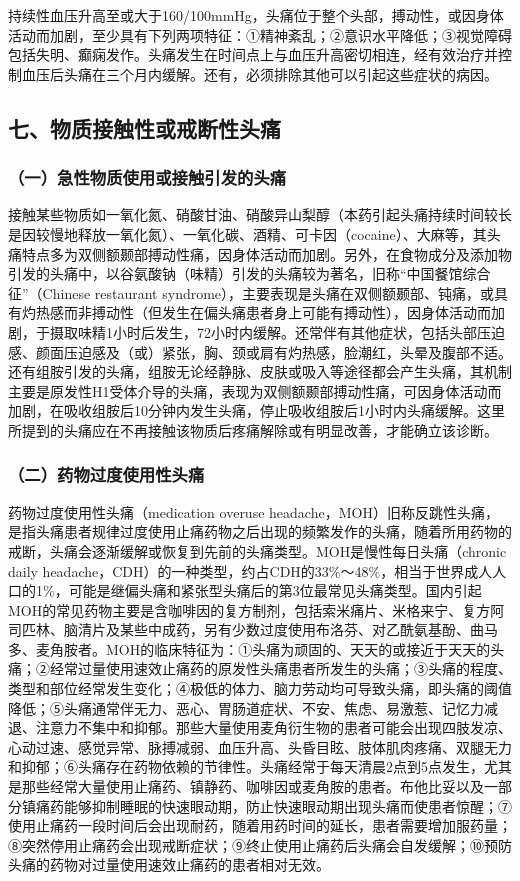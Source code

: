 持续性血压升高至或大于160/100mmHg，头痛位于整个头部，搏动性，或因身体活动而加剧，至少具有下列两项特征：①精神紊乱；②意识水平降低；③视觉障碍包括失明、癫痫发作。头痛发生在时间点上与血压升高密切相连，经有效治疗并控制血压后头痛在三个月内缓解。还有，必须排除其他可以引起这些症状的病因。

\subsection{七、物质接触性或戒断性头痛}

\subsubsection{（一）急性物质使用或接触引发的头痛}

接触某些物质如一氧化氮、硝酸甘油、硝酸异山梨醇（本药引起头痛持续时间较长是因较慢地释放一氧化氮）、一氧化碳、酒精、可卡因（cocaine）、大麻等，其头痛特点多为双侧额颞部搏动性痛，因身体活动而加剧。另外，在食物成分及添加物引发的头痛中，以谷氨酸钠（味精）引发的头痛较为著名，旧称“中国餐馆综合征”（Chinese
restaurant
syndrome），主要表现是头痛在双侧额颞部、钝痛，或具有灼热感而非搏动性（但发生在偏头痛患者身上可能有搏动性），因身体活动而加剧，于摄取味精1小时后发生，72小时内缓解。还常伴有其他症状，包括头部压迫感、颜面压迫感及（或）紧张，胸、颈或肩有灼热感，脸潮红，头晕及腹部不适。还有组胺引发的头痛，组胺无论经静脉、皮肤或吸入等途径都会产生头痛，其机制主要是原发性H1受体介导的头痛，表现为双侧额颞部搏动性痛，可因身体活动而加剧，在吸收组胺后10分钟内发生头痛，停止吸收组胺后1小时内头痛缓解。这里所提到的头痛应在不再接触该物质后疼痛解除或有明显改善，才能确立该诊断。

\subsubsection{（二）药物过度使用性头痛}

药物过度使用性头痛（medication overuse
headache，MOH）旧称反跳性头痛，是指头痛患者规律过度使用止痛药物之后出现的频繁发作的头痛，随着所用药物的戒断，头痛会逐渐缓解或恢复到先前的头痛类型。MOH是慢性每日头痛（chronic
daily
headache，CDH）的一种类型，约占CDH的33\%～48\%，相当于世界成人人口的1\%，可能是继偏头痛和紧张型头痛后的第3位最常见头痛类型。国内引起MOH的常见药物主要是含咖啡因的复方制剂，包括索米痛片、米格来宁、复方阿司匹林、脑清片及某些中成药，另有少数过度使用布洛芬、对乙酰氨基酚、曲马多、麦角胺者。MOH的临床特征为：①头痛为顽固的、天天的或接近于天天的头痛；②经常过量使用速效止痛药的原发性头痛患者所发生的头痛；③头痛的程度、类型和部位经常发生变化；④极低的体力、脑力劳动均可导致头痛，即头痛的阈值降低；⑤头痛通常伴无力、恶心、胃肠道症状、不安、焦虑、易激惹、记忆力减退、注意力不集中和抑郁。那些大量使用麦角衍生物的患者可能会出现四肢发凉、心动过速、感觉异常、脉搏减弱、血压升高、头昏目眩、肢体肌肉疼痛、双腿无力和抑郁；⑥头痛存在药物依赖的节律性。头痛经常于每天清晨2点到5点发生，尤其是那些经常大量使用止痛药、镇静药、咖啡因或麦角胺的患者。布他比妥以及一部分镇痛药能够抑制睡眠的快速眼动期，防止快速眼动期出现头痛而使患者惊醒；⑦使用止痛药一段时间后会出现耐药，随着用药时间的延长，患者需要增加服药量；⑧突然停用止痛药会出现戒断症状；⑨终止使用止痛药后头痛会自发缓解；⑩预防头痛的药物对过量使用速效止痛药的患者相对无效。

